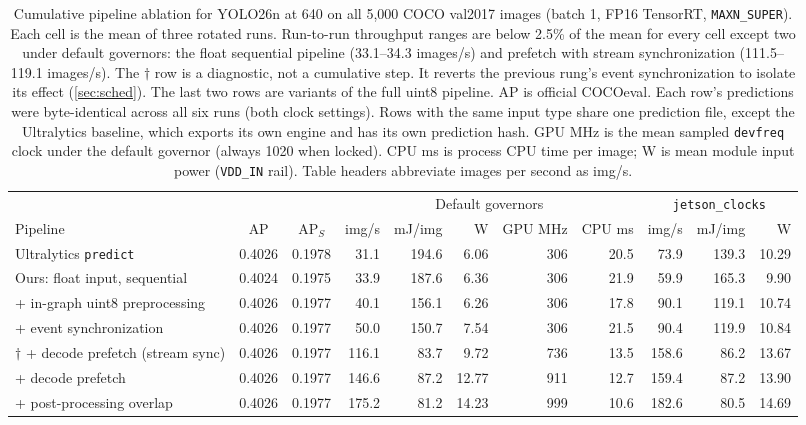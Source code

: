 \begin{table}[t]
\centering
\caption{Cumulative pipeline ablation for YOLO26n at 640 on all 5,000 COCO val2017
images (batch 1, FP16 TensorRT, \texttt{MAXN\_SUPER}). Each cell is the mean of three
rotated runs. Run-to-run throughput ranges are below 2.5\% of the mean for every
cell except two under default governors: the float sequential pipeline (33.1--34.3 images/s) and prefetch with stream synchronization (111.5--119.1 images/s). The $\dagger$ row is a diagnostic, not a cumulative step. It reverts the previous rung's event synchronization to isolate its effect (\cref{sec:sched}). The last two rows are variants of the full uint8 pipeline.
AP is official COCOeval. Each row's predictions were byte-identical across
all six runs (both clock settings). Rows with the same input type share one
prediction file, except the Ultralytics baseline, which exports its own
engine and has its own prediction hash. GPU MHz is the mean sampled \texttt{devfreq} clock under the default
governor (always 1020 when locked). CPU ms is process CPU time per
image; W is mean module input power (\texttt{VDD\_IN} rail). Table headers
abbreviate images per second as img/s.}
\label{tab:ladder}
\small
\setlength{\tabcolsep}{3.4pt}
\begin{tabular}{lcc rrrrr rrr}
\toprule
& & & \multicolumn{5}{c}{Default governors} & \multicolumn{3}{c}{\texttt{jetson\_clocks}} \\
\cmidrule(lr){4-8} \cmidrule(lr){9-11}
Pipeline & AP & AP$_S$ & img/s & mJ/img & W & GPU MHz & CPU ms & img/s & mJ/img & W \\
\midrule
Ultralytics \texttt{predict} & 0.4026 & 0.1978 & 31.1 & 194.6 & 6.06 & 306 & 20.5 & 73.9 & 139.3 & 10.29 \\ \midrule
Ours: float input, sequential & 0.4024 & 0.1975 & 33.9 & 187.6 & 6.36 & 306 & 21.9 & 59.9 & 165.3 & 9.90 \\
+ in-graph uint8 preprocessing & 0.4026 & 0.1977 & 40.1 & 156.1 & 6.26 & 306 & 17.8 & 90.1 & 119.1 & 10.74 \\
+ event synchronization & 0.4026 & 0.1977 & 50.0 & 150.7 & 7.54 & 306 & 21.5 & 90.4 & 119.9 & 10.84 \\
$\dagger$ + decode prefetch (stream sync) & 0.4026 & 0.1977 & 116.1 & 83.7 & 9.72 & 736 & 13.5 & 158.6 & 86.2 & 13.67 \\
+ decode prefetch & 0.4026 & 0.1977 & 146.6 & 87.2 & 12.77 & 911 & 12.7 & 159.4 & 87.2 & 13.90 \\
+ post-processing overlap & 0.4026 & 0.1977 & 175.2 & 81.2 & 14.23 & 999 & 10.6 & 182.6 & 80.5 & 14.69 \\

\end{tabular}
\end{table}
